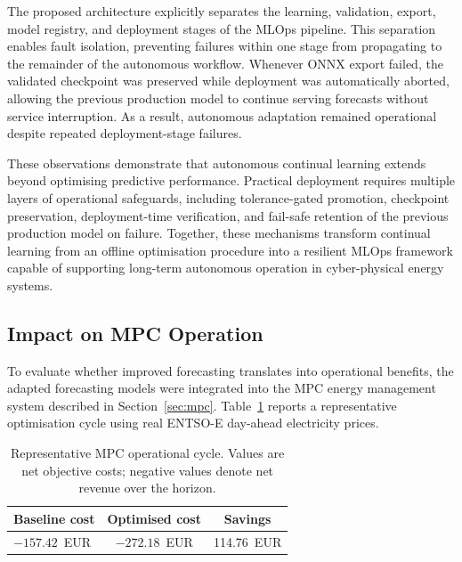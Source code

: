 \documentclass[journal]{IEEEtran}
\begin{document}
The proposed architecture explicitly separates the learning,
validation, export, model registry, and deployment stages of the MLOps
pipeline. This separation enables fault isolation, preventing failures
within one stage from propagating to the remainder of the autonomous
workflow. Whenever ONNX export failed, the validated checkpoint was
preserved while deployment was automatically aborted, allowing the
previous production model to continue serving forecasts without service
interruption. As a result, autonomous adaptation remained operational
despite repeated deployment-stage failures.

These observations demonstrate that autonomous continual learning
extends beyond optimising predictive performance. Practical deployment
requires multiple layers of operational safeguards, including
tolerance-gated promotion, checkpoint preservation, deployment-time
verification, and fail-safe retention of the previous production model
on failure. Together, these
mechanisms transform continual learning from an offline optimisation
procedure into a resilient MLOps framework capable of supporting
long-term autonomous operation in cyber-physical energy systems.

\subsection{Impact on MPC Operation}
\label{sec:results_mpc}

To evaluate whether improved forecasting translates into operational
benefits, the adapted forecasting models were integrated into the
MPC energy management system described in
Section~\ref{sec:mpc}. Table~\ref{tab:mpc_impact} reports a
representative optimisation cycle using real ENTSO-E day-ahead
electricity prices.

\begin{table}[t]
\centering
\caption{Representative MPC operational cycle. Values are net objective
costs; negative values denote net revenue over the horizon.}
\label{tab:mpc_impact}
\begin{tabular}{@{}lcc@{}}
\toprule
\textbf{Baseline cost} &
\textbf{Optimised cost} &
\textbf{Savings} \\
\midrule
$-157.42$~EUR &
$-272.18$~EUR &
114.76~EUR \\
\bottomrule
\end{tabular}
\end{table}
\end{document}
